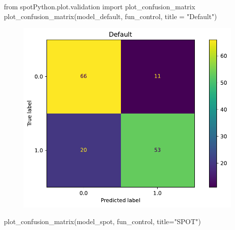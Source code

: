 \documentclass[
  letterpaper,
  DIV=11,
  numbers=noendperiod]{scrreprt}
\newenvironment{Shaded}{\begin{snugshade}}{\end{snugshade}}
\newcommand{\ImportTok}[1]{\textcolor[rgb]{0.00,0.46,0.62}{#1}}
\newcommand{\NormalTok}[1]{\textcolor[rgb]{0.00,0.23,0.31}{#1}}
\newcommand{\OperatorTok}[1]{\textcolor[rgb]{0.37,0.37,0.37}{#1}}
\newcommand{\StringTok}[1]{\textcolor[rgb]{0.13,0.47,0.30}{#1}}
\begin{document}
\begin{Shaded}
\begin{Highlighting}[]
\ImportTok{from}\NormalTok{ spotPython.plot.validation }\ImportTok{import}\NormalTok{ plot\_confusion\_matrix}
\NormalTok{plot\_confusion\_matrix(model\_default, fun\_control, title }\OperatorTok{=} \StringTok{"Default"}\NormalTok{)}
\end{Highlighting}
\end{Shaded}

\begin{figure}[H]

{\centering \includegraphics{10_spot_hpt_sklearn_classification_files/figure-pdf/cell-31-output-1.pdf}

}

\end{figure}

\begin{Shaded}
\begin{Highlighting}[]
\NormalTok{plot\_confusion\_matrix(model\_spot, fun\_control, title}\OperatorTok{=}\StringTok{"SPOT"}\NormalTok{)}
\end{Highlighting}
\end{Shaded}
\end{document}
